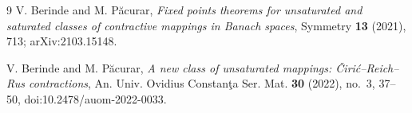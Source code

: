\documentclass[11pt]{article}
\begin{document}
\begin{thebibliography}{9}
V. Berinde and M. P\u acurar,
\emph{Fixed points theorems for unsaturated and saturated classes of
contractive mappings in Banach spaces},
Symmetry \textbf{13} (2021), 713; arXiv:2103.15148.

V. Berinde and M. P\u acurar,
\emph{A new class of unsaturated mappings: \v Ciri\'c--Reich--Rus
contractions},
An. Univ. Ovidius Constan\c ta Ser. Mat. \textbf{30} (2022), no.~3,
37--50, doi:10.2478/auom-2022-0033.
\end{thebibliography}
\end{document}
